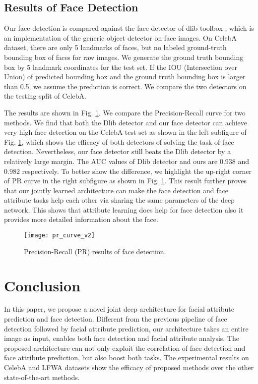 \documentclass[10pt,twocolumn,letterpaper]{article}
\begin{document}
\subsection{Results of Face Detection}

Our face detection is compared against the face detector of dlib toolbox
\cite{dlib09}, which is an implementation of the generic object detector
\cite{dalal2005histograms} on face images. On CelebA dataset, there
are only 5 landmarks of faces, but no labeled ground-truth bounding
box of faces for raw images. We generate the ground truth bounding box by 5 landmark coordinates for the test set. If the IOU (Intersection over Union) of predicted bounding box and the ground truth bounding box is larger than 0.5, we assume the prediction is correct.
We compare the two detectors on the testing split of CelebA.

The results are shown in Fig. \ref{Comparison_of_detector}. We compare
the Precision-Recall curve for two methods. We find that both the
Dlib detector and our face detector can achieve very high face detection
on the CelebA test set as shown in the left subfigure of Fig. \ref{Comparison_of_detector},
which shows the efficacy of both detectors of solving the task of
face detection. Nevertheless, our face detector still beats the Dlib
detector by a relatively large margin. The AUC values of Dlib detector
and ours are $0.938$ and $0.982$ respectively. To better show the
difference, we highlight the up-right corner of PR curve in the right
subfigure as shown in Fig. \ref{Comparison_of_detector}. This result
further proves that our jointly learned architecture can make the
face detection and face attribute tasks help each other via sharing
the same parameters of the deep network. This shows that attribute learning
does help for face detection also it provides more detailed information
about the face.

\begin{figure}
\begin{centering}
\texttt{[image: pr\_curve\_v2]} %
\par\end{centering}
\caption{\label{Comparison_of_detector}Precision-Recall (PR) results of face
detection. }
\end{figure}


\section{Conclusion}

In this paper, we propose a novel joint deep architecture for facial
attribute prediction and face detection. Different from the previous pipeline
of face detection followed by facial attribute prediction, our architecture
takes an entire image as input, enables both face detection and facial
attribute analysis. The proposed architecture can not only exploit
the correlation of face detection and face attribute prediction, but
also boost both tasks. The experimental results on CelebA and LFWA datasets
show the efficacy of proposed methods over the other state-of-the-art
methods.



{\small


}
\end{document}
